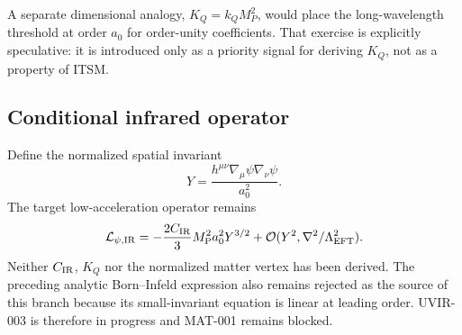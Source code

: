 A separate dimensional analogy, $K_Q=k_QM_P^2$, would place the
long-wavelength threshold at order $a_0$ for order-unity coefficients.  That
exercise is explicitly speculative: it is introduced only as a priority
signal for deriving $K_Q$, not as a property of ITSM.

\subsection{Conditional infrared operator}

Define the normalized spatial invariant
\begin{equation}
 Y=\frac{h^{\mu\nu}\nabla_\mu\psi\nabla_\nu\psi}{a_0^2}.
 \label{eq:Y}
\end{equation}
The target low-acceleration operator remains
\begin{equation}
 \mathcal L_{\psi,\rm IR}
 =-\frac{2C_{\rm IR}}{3}M_{\mathrm P}^2a_0^2Y^{3/2}
 +\mathcal O(Y^2,\nabla^2/\Lambda_{\rm EFT}^2).
 \label{eq:ir-action}
\end{equation}
Neither $C_{\rm IR}$, $K_Q$ nor the normalized matter vertex has been derived.
The preceding analytic Born--Infeld expression also remains rejected as the
source of this branch because its small-invariant equation is linear at
leading order.  UVIR-003 is therefore in progress and MAT-001 remains blocked.
